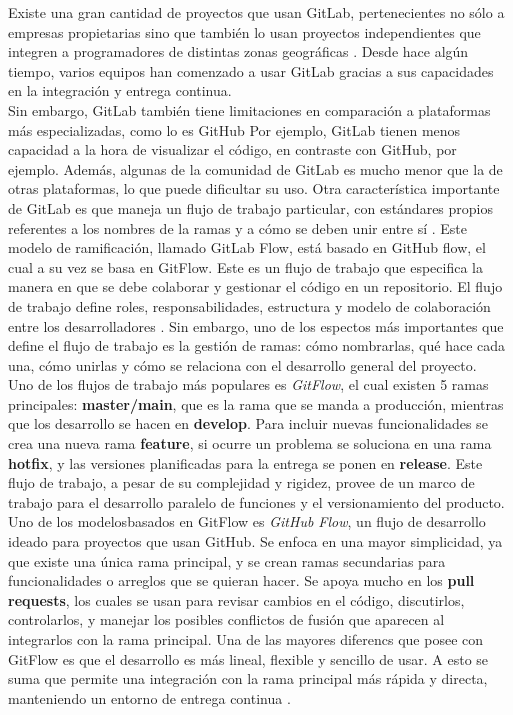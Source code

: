 \documentclass[runningheads]{llncs}
\begin{document}
Existe una gran cantidad de proyectos que usan GitLab, pertenecientes no sólo a empresas propietarias
sino que también lo usan proyectos independientes que integren a programadores de distintas zonas
geográficas \cite{safari2020structural}. Desde hace algún tiempo, varios equipos han comenzado a usar GitLab
gracias a sus capacidades en la integración y entrega continua.\\
Sin embargo, GitLab también tiene limitaciones en comparación a plataformas más especializadas, como lo es GitHub
Por ejemplo, GitLab tienen menos capacidad a la hora de visualizar el código, en contraste con GitHub, por ejemplo.
Además, algunas de la comunidad de GitLab es mucho menor que la de otras plataformas, lo que puede dificultar su uso.
Otra característica importante de GitLab es que maneja un flujo de trabajo particular, con estándares propios referentes
a los nombres de la ramas y a cómo se deben unir entre sí \cite{devineni1version}. Este modelo de ramificación, llamado
GitLab Flow, está basado en GitHub flow, el cual a su vez se basa en GitFlow. Este es un flujo de trabajo que especifica
la manera en que se debe colaborar y gestionar el código en un repositorio. El flujo de trabajo define roles, responsabilidades,
estructura y modelo de colaboración entre los desarrolladores \cite{uddin2023comparative}. Sin embargo, uno de los espectos
más importantes que define el flujo de trabajo es la gestión de ramas: cómo nombrarlas, qué hace cada una, cómo unirlas y
cómo se relaciona con el desarrollo general del proyecto.\\
Uno de los flujos de trabajo más populares es \textit{GitFlow}, el cual existen 5 ramas principales: \textbf{master/main}, que
es la rama que se manda a producción, mientras que los desarrollo se hacen en \textbf{develop}. Para incluir nuevas funcionalidades
se crea una nueva rama \textbf{feature}, si ocurre un problema se soluciona en una rama \textbf{hotfix}, y las versiones
planificadas para la entrega se ponen en \textbf{release}. Este flujo de trabajo, a pesar de su complejidad y rigidez,
provee de un marco de trabajo para el desarrollo paralelo de funciones y el versionamiento del producto.\\
Uno de los modelosbasados en GitFlow es \textit{GitHub Flow}, un flujo de desarrollo ideado para proyectos que usan GitHub.
Se enfoca en una mayor simplicidad, ya que existe una única rama principal, y se crean ramas secundarias para funcionalidades
o arreglos que se quieran hacer. Se apoya mucho en los \textbf{pull requests}, los cuales se usan para revisar cambios en el
código, discutirlos, controlarlos, y manejar los posibles conflictos de fusión que aparecen al integrarlos con la rama principal.
Una de las mayores diferencs que posee con GitFlow es que el desarrollo es más lineal, flexible y sencillo de usar. A esto se
suma que permite una integración con la rama principal más rápida y directa, manteniendo un entorno de entrega continua \cite{devineni1version}.
\end{document}
